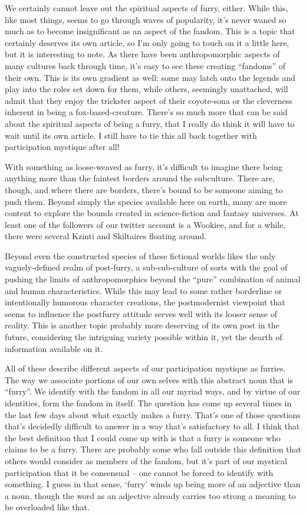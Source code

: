 We certainly cannot leave out the spiritual aspects of furry, either.  While this, like most things, seems to go through waves of popularity, it's never waned so much as to become insignificant as an aspect of the fandom. This is a topic that certainly deserves its own article, so I'm only going to touch on it a little here, but it is interesting to note. As there have been anthropomorphic aspects of many cultures back through time, it's easy to see these creating ``fandoms'' of their own. This is its own gradient as well: some may latch onto the legends and play into the roles set down for them, while others, seemingly unattached, will admit that they enjoy the trickster aspect of their coyote-sona or the cleverness inherent in being a fox-based-creature.  There's so much more that can be said about the spiritual aspects of being a furry, that I really do think it will have to wait until its own article.  I still have to tie this all back together with participation mystique after all!

With something as loose-weaved as furry, it's difficult to imagine there being anything more than the faintest borders around the subculture.  There are, though, and where there are borders, there's bound to be someone aiming to push them.  Beyond simply the species available here on earth, many are more content to explore the bounds created in science-fiction and fantasy universes.  At least one of the followers of our twitter account is a Wookiee, and for a while, there were several Kzinti and Skiltaires floating around.

Beyond even the constructed species of these fictional worlds likes the only vaguely-defined realm of post-furry, a sub-sub-culture of sorts with the goal of pushing the limits of anthropomorphics beyond the ``pure'' combination of animal and human characteristics.  While this may lead to some rather borderline or intentionally humorous character creations, the postmodernist viewpoint that seems to influence the postfurry attitude serves well with its looser sense of reality.  This is another topic probably more deserving of its own post in the future, considering the intriguing variety possible within it, yet the dearth of information available on it.

All of these describe different aspects of our participation mystique as furries.  The way we associate portions of our own selves with this abstract noun that is ``furry''.  We identify with the fandom in all our myriad ways, and by virtue of our identities, form the fandom in itself.  The question has come up several times in the last few days about what exactly makes a furry.  That's one of those questions that's decidedly difficult to answer in a way that's satisfactory to all.  I think that the best definition that I could come up with is that a furry is someone who claims to be a furry.  There are probably some who fall outside this definition that others would consider as members of the fandom, but it's part of our mystical participation that it be consensual -- one cannot be forced to identify with something.  I guess in that sense, ‘furry' winds up being more of an adjective than a noun, though the word as an adjective already carries too strong a meaning to be overloaded like that.

